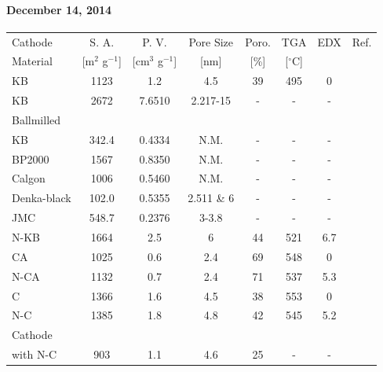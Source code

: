 \documentclass[12pt]{book}
\begin{document}
\paragraph*{December 14, 2014}
\begin{tabular}{lccccccc}
	\hline
	Cathode & S. A. & P. V. & Pore Size & Poro. & TGA  & EDX & Ref. \\
	Material & [m$^2$ g$^{-1}$] & [cm$^3$ g$^{-1}$] & [nm] & [\%] & [$^\circ$C] &  &\\\hline
	KB & 1123 & 1.2 & 4.5 & 39  & 495  & 0 &  \\
	KB & 2672 & 7.6510 & 2.217-15 & -  & -  & - & \cite{Xiao2010} \\
	Ballmilled & &  & & & & &\\
	KB & 342.4 & 0.4334 & N.M. & -  & -  & - & \cite{Xiao2010} \\
	BP2000 & 1567 & 0.8350 & N.M. & -  & -  & - & \cite{Xiao2010} \\
	Calgon & 1006 & 0.5460 & N.M. & -  & -  & - & \cite{Xiao2010} \\
	Denka-black & 102.0 & 0.5355 & 2.511 \& 6 & -  & -  & - & \cite{Xiao2010} \\
	JMC & 548.7 & 0.2376 & 3-3.8 & -  & -  & - & \cite{Xiao2010} \\
	N-KB & 1664 & 2.5 & 6 & 44 & 521 & 6.7 & \\
	CA & 1025 & 0.6 & 2.4 & 69 & 548 & 0 & \\
	N-CA & 1132 & 0.7  & 2.4 & 71 & 537 & 5.3 & \\
	C & 1366 & 1.6 & 4.5 & 38 & 553 & 0 & \\
	N-C & 1385 & 1.8 & 4.8 & 42 & 545 & 5.2 &  \\
	Cathode &  & & & & & &\\
	with N-C & 903 & 1.1 & 4.6 & 25 & - & - & \\
	\hline
\end{tabular} 
\end{document}
